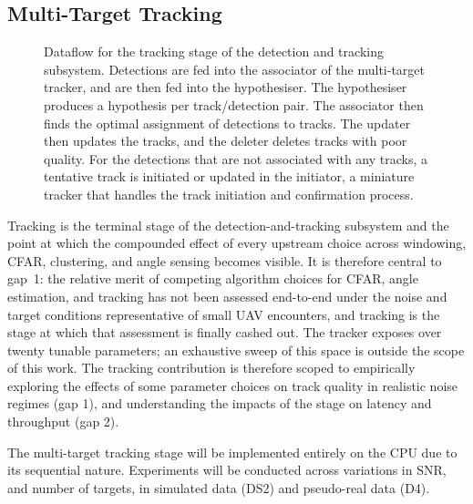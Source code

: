 
\subsection{Multi-Target Tracking}

\begin{figure}[htbp]
    \centering
    \caption[Dataflow diagram for the tracking subsystem.]{Dataflow for the tracking stage of the 
    detection and tracking subsystem. Detections are fed into the
    associator of the multi-target tracker, and are then fed into the hypothesiser. 
    The hypothesiser produces a hypothesis per track/detection pair. The associator then 
    finds the optimal assignment
    of detections to tracks. The updater then updates the tracks, and the deleter deletes 
    tracks with poor quality. For the detections that are not associated with any tracks,
    a tentative track is initiated or updated in the initiator, a miniature tracker that
    handles the track initiation and confirmation process. 
    }
    \label{fig:tracking-dataflow}
\end{figure}

Tracking is the terminal stage of the detection-and-tracking subsystem and the point 
at which the compounded effect of every upstream choice across windowing, CFAR, 
clustering, and angle sensing becomes visible. It is therefore central to 
gap~1: the relative merit of competing 
algorithm choices for CFAR, angle estimation, and tracking has not been assessed 
end-to-end under the noise and target conditions representative of small UAV encounters, 
and tracking is the stage at which that assessment is finally cashed out. The tracker 
exposes over twenty tunable parameters; an exhaustive sweep of this space is 
outside the scope of this work. The tracking contribution is therefore scoped to 
empirically
exploring the effects of some parameter choices on track quality in realistic noise regimes 
(gap 1), and understanding 
the impacts of the stage on latency and throughput (gap 2).

The multi-target tracking stage will be implemented entirely on the CPU due to its sequential nature. Experiments will
be conducted across variations in SNR, and number of targets, in simulated data (DS2) and pseudo-real data (D4). 

